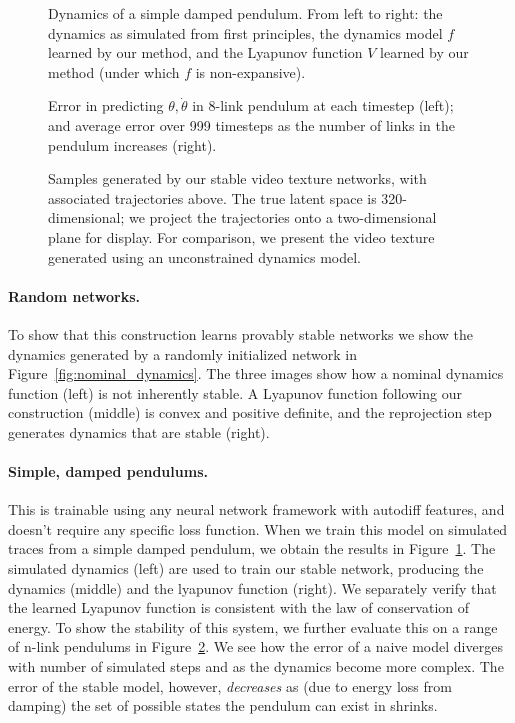 \documentclass[11pt]{article}
\begin{document}
\begin{figure}[p]
  \centering
  
  \caption{Dynamics of a simple damped pendulum. From left to right: the dynamics as simulated from first principles, the dynamics model $f$ learned by our method, and the Lyapunov function $V$ learned by our method (under which $f$ is non-expansive).}
  \label{fig:pendulum_experiment}
\end{figure}

\begin{figure}[p]
  \centering
  
  \caption{Error in predicting $\theta, \dot \theta$ in 8-link pendulum at each timestep (left); and average error over 999 timesteps as the number of links in the pendulum increases (right). }
  \label{fig:pendulum_results}
\end{figure}

\begin{figure}[p]
  \centering
  
  \caption{Samples generated by our stable video texture networks, with associated trajectories above. The true latent space is 320-dimensional; we project the trajectories onto a two-dimensional plane for display. For comparison, we present the video texture generated using an unconstrained dynamics model.}
  \label{fig:vae_results}
\end{figure}


\paragraph{Random networks. } To show that this construction learns provably stable networks we show the dynamics generated by a randomly initialized network in Figure~\ref*{fig:nominal_dynamics}. The three images show how a nominal dynamics function (left) is not inherently stable. A Lyapunov function following our construction (middle) is convex and positive definite, and the reprojection step generates dynamics that are stable (right).

\paragraph{Simple, damped pendulums. } This is trainable using any neural network framework with autodiff features, and doesn't require any specific loss function. When we train this model on simulated traces from a simple damped pendulum, we obtain the results in Figure~\ref*{fig:pendulum_experiment}. The simulated dynamics (left) are used to train our stable network, producing the dynamics (middle) and the lyapunov function (right). We separately verify that the learned Lyapunov function is consistent with the law of conservation of energy. To show the stability of this system, we further evaluate this on a range of n-link pendulums in Figure~\ref{fig:pendulum_results}. We see how the error of a naive model diverges with number of simulated steps and as the dynamics become more complex. The error of the stable model, however, \emph{decreases} as (due to energy loss from damping) the set of possible states the pendulum can exist in shrinks.
\end{document}
